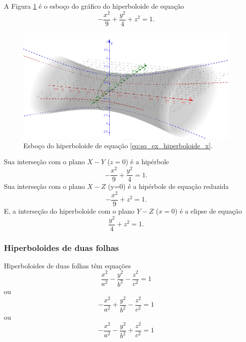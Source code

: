 \begin{ex}
  A Figura \ref{fig:sq_ex_hiperboloide_x} é o esboço do gráfico do hiperboloide de equação
  \begin{equation}\label{eq:sq_ex_hiperboloide_x}
    -\frac{x^2}{9}+\frac{y^2}{4}+z^2=1.
  \end{equation}

  \begin{figure}[H]
    \centering
    \includegraphics[width=\textwidth]{./cap_superquad/dados/fig_sq_ex_hiperboloide_x/fig}
    \caption{Esboço do hiperboloide de equação \eqref{eq:sq_ex_hiperboloide_x}.}
    \label{fig:sq_ex_hiperboloide_x}
  \end{figure}
  
  
  Sua interseção com o plano $X-Y$ ($z=0$) é a hipérbole
  \begin{equation}
    -\frac{x^2}{9}+\frac{y^2}{4}=1.
  \end{equation}
  Sua interseção com o plano $X-Z$ (y=0) é a hipérbole de equação reduzida
  \begin{equation}
    -\frac{x^2}{9}+z^2=1.
  \end{equation}
  E, a interseção do hiperboloide com o plano $Y-Z$ ($x=0$) é a elipse de equação
  \begin{equation}
    \frac{y^2}{4}+z^2=1.
  \end{equation}
\end{ex}

\subsubsection{Hiperboloides de duas folhas}

Hiperboloides de duas folhas têm equações
\begin{equation}
  \frac{x^2}{a^2}-\frac{y^2}{b^2}-\frac{z^2}{c^2}=1
\end{equation}
ou
\begin{equation}
  -\frac{x^2}{a^2}+\frac{y^2}{b^2}-\frac{z^2}{c^2}=1
\end{equation}
ou
\begin{equation}
  -\frac{x^2}{a^2}-\frac{y^2}{b^2}+\frac{z^2}{c^2}=1
\end{equation}

